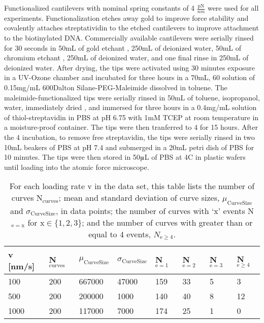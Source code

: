 \firstp Functionalized cantilevers with nominal spring constants of 4 $\frac{\text{pN}}{nm}$  were used for all experiments. Functionalization etches away gold to improve force stability\cite{sullan_atomic_2013} and covalently attaches streptatividin to the etched cantilevers to improve attachment to the biotinylated DNA. Commercially available cantilevers  were serially rinsed for 30 seconds in 50mL of gold etchant , 250mL of deionized water, 50mL of chromium etchant , 250mL of deionized water, and one final rinse in 250mL of deionized water. After drying, the tips were activated using 30 minutes exposure in a UV-Ozone chamber and incubated for three hours in a 70mL, 60\degreeC{} solution of 0.15mg/mL 600Dalton Silane-PEG-Maleimide  dissolved in toluene. The maleimide-functionalized tips were serially rinsed in 50mL of toluene, isopropanol, water, immediately dried , and immersed for three hours in a 0.4mg/mL solution of thiol-streptavidin  in PBS  at pH 6.75 with 1mM TCEP  at room temperature in a moisture-proof container. The tips were then tranferred to 4\degreeC{} for 15 hours. After the 4\degreeC{} incubation, to remove free streptavidin, the tips were serially rinsed in two 10mL beakers of PBS at pH 7.4 and submerged in a 20mL petri dish of PBS for 10 minutes. The tips were then stored in 50$\muup$L of PBS at 4C in plastic wafers  until loading into the atomic force microscope. \pl


\begin{table}[htp]
\caption[Data set statistical information]{ For each loading rate v in the data set, this table lists the number of curves N$_{\mathrm{curves}}$; mean and standard deviation of curve sizes, $\mu_{\mathrm{Curve Size}}$ and $\sigma_{\mathrm{Curve Size}}$, in data points; the number of curves with `x' events N$_{\mathrm{e=x}}$ for x$\in\{1,2,3\}$; and the number of curves with greater than or equal to 4 events, $N_{\mathrm{e}\ge4}$. }
\begin{tabularx}{\textwidth}{ l | l | l | l |l |l|l|l }
\hline \hline
v [nm/s] & N$_\mathrm{curves}$ & $\mu_{\mathrm{Curve Size}}$ & $\sigma_{\mathrm{Curve Size}}$ & N$_{\mathrm{e}= 1}$ & N$_{\mathrm{e}= 2}$ & N$_{\mathrm{e}= 3}$ & N$_{\mathrm{e}\ge4}$  \\ \hline
100 & 200 & 667000 & 47000 & 159 & 33 & 5 & 3  \\ \hline
500 & 200 & 200000 & 1000 & 140 & 40 & 8 & 12  \\ \hline
1000 & 200 & 117000 & 7000 & 174 & 25 & 1 & 0  \\ \hline
\end{tabularx}
\end{table}



